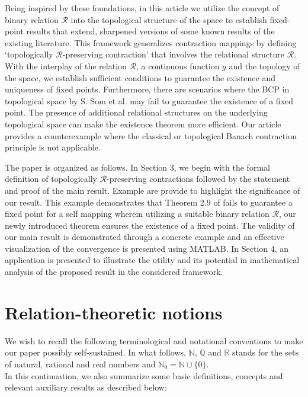 \documentclass[10pt, reqno]{amsart}
\theoremstyle{definition}
\theoremstyle{remark}
\numberwithin{equation}{section}
\begin{document}
 Being inspired by  these foundations, in this article we utilize the concept of  binary relation $ \mathcal{R} $  into the topological structure of the space to establish   fixed-point results that   extend, sharpened versions of some known results of the existing literature. This framework generalizes contraction mappings by defining `topologically $  \mathcal{R} $-preserving contraction' that involves   the relational structure $  \mathcal{R} $.    
 With the interplay of    the relation $   \mathcal{R}  $,    a continuous    function $g$   and the topology of the space,  we establish sufficient conditions to guarantee the existence and uniqueness of fixed points.
  Furthermore,  there are scenarios where the BCP in topological space by S. Som et al. \cite{S.Som} may fail to guarantee the existence of a fixed point. The presence of additional relational structures on the underlying topological space  can make the existence theorem more efficient.   Our article  provides a  counterexample where the classical or topological Banach contraction principle is not applicable.  
  
 The paper is organized as follows. In Section 3, we begin with the formal definition of topologically $  \mathcal{R} $-preserving contractions    followed by the statement and proof of the main result. Example are provide to  highlight the significance of our result. This example   demonstrates that Theorem 2.9 of \cite{S.Som} fails to guarantee a fixed point for a self mapping wherein  utilizing a suitable binary relation $ \mathcal{R}$,  our newly introduced theorem ensures  the existence of a fixed point. The validity of our main result is demonstrated through a concrete example and an effective visualization of the convergence is presented using MATLAB.
 In Section 4, an   application is presented to illustrate the utility and its potential in mathematical analysis of the proposed result in the considered framework.

   
\section{Relation-theoretic notions}

We wish to recall the following terminological and notational conventions to make our paper possibly self-sustained. In what follows, $\mathbb{N}$, $\mathbb{Q}$  and $\mathbb{R}$ stands for the sets of natural, rational    and real numbers  and  $\mathbb{N}_{0}=\mathbb{N}\cup\{0\}$.\\
%
\noindent In this continuation, we also summarize some basic   definitions, concepts and relevant auxiliary results as described below:
\end{document}
